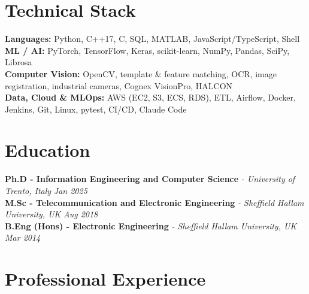 \documentclass[11pt]{article}
\begin{document}
\section*{Technical Stack}
\textbf{Languages:} Python, C++17, C, SQL, MATLAB, JavaScript/TypeScript, Shell\\
\textbf{ML / AI:} PyTorch, TensorFlow, Keras, scikit-learn, NumPy, Pandas, SciPy, Librosa\\
\textbf{Computer Vision:} OpenCV, template \& feature matching, OCR, image registration, industrial cameras, Cognex VisionPro, HALCON\\
\textbf{Data, Cloud \& MLOps:} AWS (EC2, S3, ECS, RDS), ETL, Airflow, Docker, Jenkins, Git, Linux, pytest, CI/CD, Claude Code

\section*{Education}
\textbf{Ph.D - Information Engineering and Computer Science} \textit{\small{ - University of Trento, Italy}} \hfill \textit{Jan 2025}\\[2pt]
\noindent\textbf{M.Sc - Telecommunication and Electronic Engineering} \textit{\small{ - Sheffield Hallam University, UK}} \hfill \textit{Aug 2018}\\[2pt]
\noindent\textbf{B.Eng (Hons) - Electronic Engineering} \textit{\small{ - Sheffield Hallam University, UK}} \hfill \textit{Mar 2014}

\section*{Professional Experience}
\end{document}
